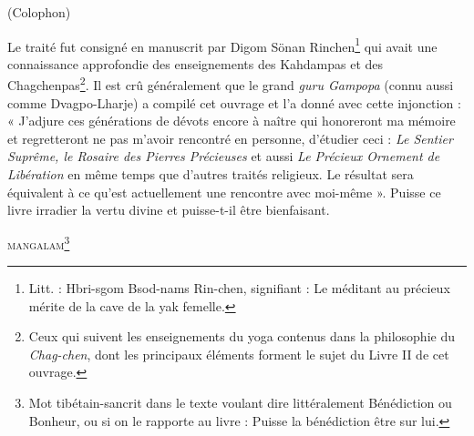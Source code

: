 \documentclass[10pt]{book}
\begin{document}
\begin{center}
(Colophon)\\
\end{center}
Le traité fut consigné en manuscrit par Digom Sönan Rinchen\footnote{Litt. : Hbri-sgom Bsod-nams Rin-chen, signifiant : Le méditant au précieux mérite de la cave de la yak femelle.} qui avait une connaissance approfondie des enseignements des Kahdampas et des Chagchenpas\footnote{Ceux qui suivent les enseignements du yoga contenus dans la philosophie du \textit{Chag-chen}, dont les principaux éléments forment le sujet du Livre II de cet ouvrage.}.
Il est crû généralement que le grand \textit{guru Gampopa} (connu aussi comme Dvagpo-Lharje) a compilé cet ouvrage et l'a donné avec cette injonction : « J'adjure ces générations de dévots encore à naître qui honoreront ma mémoire et regretteront ne pas m'avoir rencontré en personne, d'étudier ceci : \textit{Le Sentier Suprême, le Rosaire des Pierres Précieuses} et aussi \textit{Le Précieux Ornement de Libération} en même temps que d'autres traités religieux. Le résultat sera équivalent à ce qu'est actuellement une rencontre avec moi-même ».
Puisse ce livre irradier la vertu divine et puisse-t-il être bienfaisant.
\vspace{1cm}
\begin{center}
\textsc{mangalam\footnote{Mot tibétain-sancrit dans le texte voulant dire littéralement Bénédiction ou Bonheur, ou si on le rapporte au livre : Puisse la bénédiction être sur lui.}}
\end{center}
\end{document}
